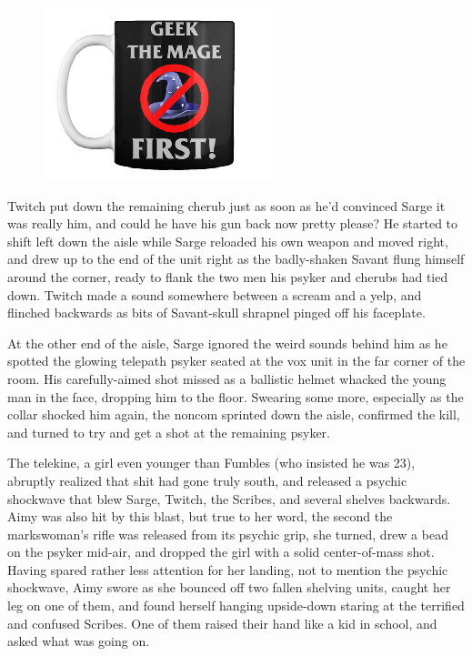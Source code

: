\begin{figure}
	\begin{center}
		\includegraphics[width=\figwidth]{pics/21/90.png}
	\end{center}
\end{figure}
Twitch put down the remaining cherub just as soon as he'd convinced Sarge it was really him, and could he have his gun back now pretty please? 
He started to shift left down the aisle while Sarge reloaded his own weapon and moved right, and drew up to the end of the unit right as the badly-shaken Savant flung himself around the corner, ready to flank the two men his psyker and cherubs had tied down. 
Twitch made a sound somewhere between a scream and a yelp, and flinched backwards as bits of Savant-skull shrapnel pinged off his faceplate. 


At the other end of the aisle, Sarge ignored the weird sounds behind him as he spotted the glowing telepath psyker seated at the vox unit in the far corner of the room. 
His carefully-aimed shot missed as a ballistic helmet whacked the young man in the face, dropping him to the floor. 
Swearing some more, especially as the collar shocked him again, the noncom sprinted down the aisle, confirmed the kill, and turned to try and get a shot at the remaining psyker.

The telekine, a girl even younger than Fumbles (who insisted he was 23), abruptly realized that shit had gone truly south, and released a psychic shockwave that blew Sarge, Twitch, the Scribes, and several shelves backwards. 
Aimy was also hit by this blast, but true to her word, the second the markswoman's rifle was released from its psychic grip, she turned, drew a bead on the psyker mid-air, and dropped the girl with a solid center-of-mass shot. 
Having spared rather less attention for her landing, not to mention the psychic shockwave, Aimy swore as she bounced off two fallen shelving units, caught her leg on one of them, and found herself hanging upside-down staring at the terrified and confused Scribes. 
One of them raised their hand like a kid in school, and asked what was going on.

